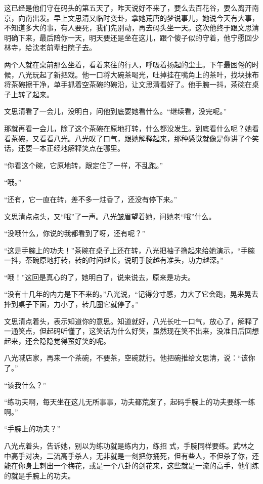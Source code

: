 这已经是他们守在码头的第五天了，昨天说好不来了，要么去百花谷，要么离开南京，向南出发。早上文思清又临时变卦，拿她荒唐的梦说事儿，她说今天有大事，不知道多大的事，有人要死，我们先别动，再去码头坐一天。这次他终于跟文思清明确下来，最后陪你一天，明天要还是坐在这儿，跟个傻子似的守着，他宁愿回少林寺，给沈老前辈扫院子去。

两个人就在桌前那么坐着，看着来往的行人，呼吸着扬起的尘土。下午最困倦的时候，八光玩起了新把戏。他一口将大碗茶喝光，吐掉挂在嘴角上的茶叶，找块抹布将茶碗擦干净，单手抓着空茶碗的碗沿，让文思清看好了。他手腕一抖，茶碗在桌子上转了起来。

文思清看了一会儿，没明白，问他到底要她看什么。“继续看，没完呢。”

那就再看一会儿，除了这个茶碗在原地打转，什么都没发生。到底看什么呢？她看看茶碗，又看看八光。八光叹了口气，跟她解释起来，那种感觉就像是你讲了个笑话，还要一本正经地解释笑点在哪里。

“你看这个碗，它原地转，跟定住了一样，不乱跑。”

“哦。”

“还有，它一直在转，差不多一炷香了，还没有停下来。”

文思清点点头，又“哦”了一声。八光皱眉望着她，问她老“哦”什么。

“没哦什么，你说的我都看到了呀，还有呢？”

“这是手腕上的功夫！”茶碗在桌子上还在转，八光把袖子撸起来给她演示，“手腕一抖，茶碗原地打转，转的时间越长，说明手腕越有准头，功力越深。”

“哦！”这回是真心的了，她明白了，说来说去，原来是功夫。

“没有十几年的内力是下不来的。”八光说，“记得分寸感，力大了它会跑，晃来晃去摔到桌子下面，力小了，转几圈它就停了。”

文思清点着头，表示知道你的意思。知道就好，八光长吐一口气，放心了，解释了一通笑点，但起码听懂了，这笑话为什么好笑，虽然现在笑不出来，没准日后回想起来，还会隐隐觉得蛮好笑的呢。

八光喊店家，再来一个茶碗，不要茶，空碗就行。他把碗推给文思清，说：“该你了。”

“该我什么？”

“练功夫啊，每天坐在这儿无所事事，功夫都荒废了，起码手腕上的功夫要练一练啊。”

“手腕上的功夫？”

八光点着头，告诉她，别以为练功就是练内力，练招
式，手腕同样要练。武林之中高手对决，二流高手杀人，无非就是一剑把你捅死，但有些人，不但杀了你，还能在你身上刺出一个梅花，或是一个八卦的剑花来，这些就是一流的高手，他们练的就是手腕上的功夫。

